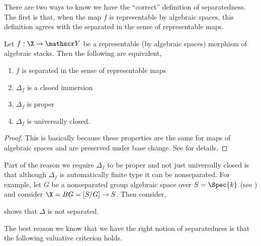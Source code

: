 \documentclass[12pt]{article}
\begin{document}
\begin{rmk}
There are two ways to know we have the ``correct'' definition of separatedness. The first is that, when the map $f$ is representable by algebraic spaces, this definition agrees with the separated in the sense of representable maps.
\end{rmk}

\begin{lemma}
Let $f: \X \to \Y$ be a representable (by algebraic spaces) morphism of algebraic stacks. Then the following are equivalent,
\begin{enumerate}
\item $f$ is separated in the sense of representable maps
\item $\Delta_f$ is a clsoed immersion
\item $\Delta_f$ is proper
\item $\Delta_f$ is universally closed. 
\end{enumerate}
\end{lemma}

\begin{proof}
This is basically because these properties are the same for maps of algebraic spaces and are preserved under base change. See  for details. 
\end{proof}

\begin{rmk}
Part of the reason we require $\Delta_f$ to be proper and not just universally closed is that although $\Delta_f$ is automatically finite type it can be nonseparated. For example, let $G$ be a nonseparated group algebraic space over $S = \Spec{k}$ (see ) and consider $\X = BG = [S/G] \to S$. Then consider,
\begin{center}
\end{center}
shows that $\Delta$ is not separated.
\end{rmk}

\begin{rmk}
The best reason we know that we have the right notion of separatedness is that the following valuative criterion holds.
\end{rmk}
\end{document}
